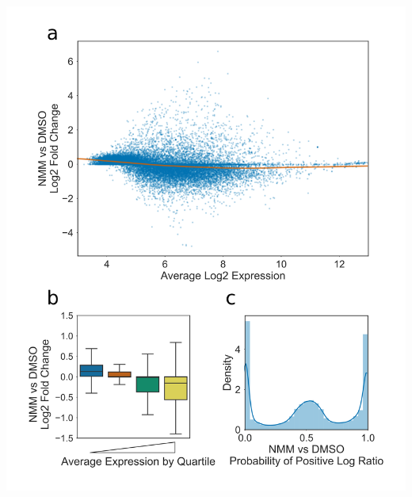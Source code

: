 \documentclass[12pt,a4paper,]{report}
\let\origfigure=\figure
\let\endorigfigure=\endfigure
\renewenvironment{figure}[1][2] {
    \expandafter\origfigure\expandafter[H]
} {
    \endorigfigure
}
\begin{document}
\begin{figure}[htbp]
\centering
\includegraphics[width=\textwidth,height=562pt,keepaspectratio]{chapter_5/figures/nmm_vs_dmso.png}
\caption[Global effect of NMM on Gene Expression.]{\textbf{Global   effect   of   NMM   on   Gene   Expression.}   \textbf{a)}   MA   plot   showing   relationship   between   average   gene   expression   and   Log2   fold   change   in   expression   upon   treatment   with   NMM.   Orange   line   is   lowess   curve   fit   showing   slight   negative   correlation   between   expression   and   fold   change   for   genes   in   the   expression   range   4-8.   \textbf{b)}   Boxplot   of   Log2   fold   change   in   expression   upon   treatment   with   NMM,   cut   on   quartiles   by   average   expression.   Lowest   expressed   25\%   is   leftmost,   and   highest   expressed   is   rightmost.   Lower   quartile,   median,   and   upper   quartile   are   at   4.6,   5.4,   and   6.5,   respectively.   \textbf{c)}   Histogram   and   kernel   density   estimate   showing   distribution   of   Probability   of   Positive   Log   Ratio   (PPLR)   values.   PPLRs   which   tend   towards   zero   represent   negatively   differentially   expressed   genes,   whilst   PPLRs   which   tend   towards   one   represent   positively   differentially   expressed   genes.   \label{nmm}}
\end{figure}
\end{document}
